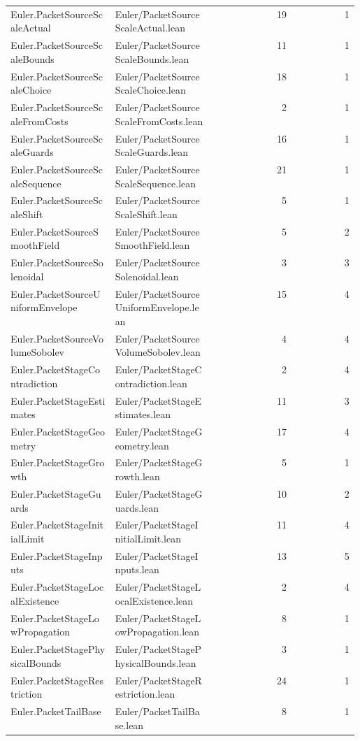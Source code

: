 \begin{longtable}{p{0.30\linewidth}p{0.28\linewidth}rr}
Euler.PacketSourceScaleActual & Euler/PacketSourceScaleActual.lean & 19 & 1\\
Euler.PacketSourceScaleBounds & Euler/PacketSourceScaleBounds.lean & 11 & 1\\
Euler.PacketSourceScaleChoice & Euler/PacketSourceScaleChoice.lean & 18 & 1\\
Euler.PacketSourceScaleFromCosts & Euler/PacketSourceScaleFromCosts.lean & 2 & 1\\
Euler.PacketSourceScaleGuards & Euler/PacketSourceScaleGuards.lean & 16 & 1\\
Euler.PacketSourceScaleSequence & Euler/PacketSourceScaleSequence.lean & 21 & 1\\
Euler.PacketSourceScaleShift & Euler/PacketSourceScaleShift.lean & 5 & 1\\
Euler.PacketSourceSmoothField & Euler/PacketSourceSmoothField.lean & 5 & 2\\
Euler.PacketSourceSolenoidal & Euler/PacketSourceSolenoidal.lean & 3 & 3\\
Euler.PacketSourceUniformEnvelope & Euler/PacketSourceUniformEnvelope.lean & 15 & 4\\
Euler.PacketSourceVolumeSobolev & Euler/PacketSourceVolumeSobolev.lean & 4 & 4\\
Euler.PacketStageContradiction & Euler/PacketStageContradiction.lean & 2 & 4\\
Euler.PacketStageEstimates & Euler/PacketStageEstimates.lean & 11 & 3\\
Euler.PacketStageGeometry & Euler/PacketStageGeometry.lean & 17 & 4\\
Euler.PacketStageGrowth & Euler/PacketStageGrowth.lean & 5 & 1\\
Euler.PacketStageGuards & Euler/PacketStageGuards.lean & 10 & 2\\
Euler.PacketStageInitialLimit & Euler/PacketStageInitialLimit.lean & 11 & 4\\
Euler.PacketStageInputs & Euler/PacketStageInputs.lean & 13 & 5\\
Euler.PacketStageLocalExistence & Euler/PacketStageLocalExistence.lean & 2 & 4\\
Euler.PacketStageLowPropagation & Euler/PacketStageLowPropagation.lean & 8 & 1\\
Euler.PacketStagePhysicalBounds & Euler/PacketStagePhysicalBounds.lean & 3 & 1\\
Euler.PacketStageRestriction & Euler/PacketStageRestriction.lean & 24 & 1\\
Euler.PacketTailBase & Euler/PacketTailBase.lean & 8 & 1\\

\end{longtable}
